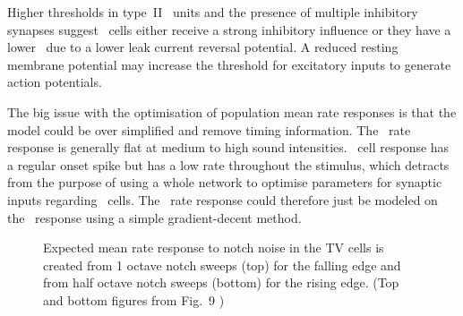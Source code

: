 
Higher thresholds in type~II \DCN~units \citep{SpirouDavisEtAl:1999} and the presence of multiple inhibitory synapses \citep{Alibardi:2006} suggest \TV~cells either receive a strong inhibitory influence or they have a lower \RMP~due to a lower leak current reversal potential. A reduced resting membrane potential may increase the threshold for excitatory inputs to generate action potentials.



The big issue with the optimisation of population mean rate responses is that the model could be over simplified and remove timing information.
The \HSR~rate response is generally flat at medium to high sound intensities.
\DS~cell response has a regular onset spike but has a low rate throughout the stimulus, which detracts from the purpose of using a whole network to optimise parameters for synaptic inputs regarding \TV~cells.
The \TV~rate response could therefore just be modeled on the \LSR~response using a simple gradient-decent method.





\begin{figure}[htb]
  \centering {}
  \caption[TV model optimisation configuration]{Expected mean rate response to notch noise in the TV cells is created from 1 octave notch sweeps (top) for the falling edge and from half octave notch sweeps (bottom) for the rising edge. (Top and bottom figures from Fig.~9 \citep*{ReissYoung:2005})}   \label{fig:TVNotchDiagram}
\end{figure}

